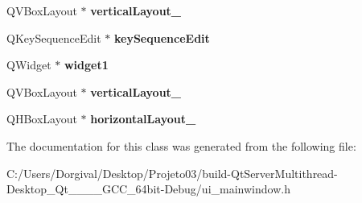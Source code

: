 \begin{DoxyCompactItemize}
Q\+V\+Box\+Layout $\ast$ {\bfseries vertical\+Layout\+\_}
\item 
\mbox{\label{class_ui___main_window_a61dbf7c412581281482647c8814fe82a}} 
Q\+Key\+Sequence\+Edit $\ast$ {\bfseries key\+Sequence\+Edit}
\item 
\mbox{\label{class_ui___main_window_ad28aa003edd69668ad54491ec5a63ccd}} 
Q\+Widget $\ast$ {\bfseries widget1}
\item 
\mbox{\label{class_ui___main_window_a38b8a4b887f3b58e2a49e7905ae6f1f0}} 
Q\+V\+Box\+Layout $\ast$ {\bfseries vertical\+Layout\+\_}
\item 
\mbox{\label{class_ui___main_window_ae183387a7d233b437a637b403ba39ffd}} 
Q\+H\+Box\+Layout $\ast$ {\bfseries horizontal\+Layout\+\_}
\end{DoxyCompactItemize}


The documentation for this class was generated from the following file\+:\begin{DoxyCompactItemize}
\item 
C\+:/\+Users/\+Dorgival/\+Desktop/\+Projeto03/build-\/\+Qt\+Server\+Multithread-\/\+Desktop\+\_\+\+Qt\+\_\+\_\+\_\+\_\+\+G\+C\+C\+\_\+64bit-\/\+Debug/ui\+\_\+mainwindow.\+h\end{DoxyCompactItemize}
